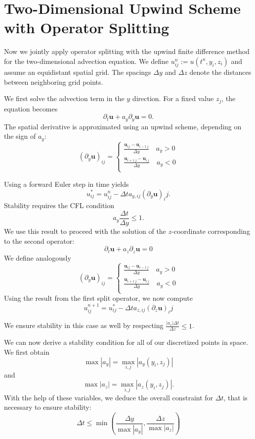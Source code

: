 \section{Two-Dimensional Upwind Scheme with Operator Splitting}\label{2DUpwind}
Now we jointly apply operator splitting with the upwind finite difference
method for the two-dimensional advection equation. We define $u_{ij}^n
:= u(t^n, y_i, z_i)$ and assume an equidistant spatial grid. The spacings
$\Delta y$ and $\Delta z$ denote the distances between neighboring grid
points.

We first solve the advection term in the $y$ direction. For a fixed value
$z_j$, the equation becomes
$$\partial_t \bm{u} + a_y\partial_y \bm{u} = 0.$$
The spatial derivative is approximated using an upwind scheme,
depending on the sign of $a_y$:
\[
(\partial_y\bm{u})_{ij}=
\begin{cases}
    \frac{\bm{u}_{ij}-\bm{u}_{i-1 \,j}}{\Delta y} \quad a_y > 0 \\
     \frac{\bm{u}_{i+1\,j}-\bm{u}_{i\,j}}{\Delta y} \quad a_y < 0 \\
\end{cases}
\]

Using a forward Euler step in time yields
$$u_{ij}^*= u_{ij}^n - \Delta t a_{y,ij}(\partial_y \bm{u})_ij.$$
Stability requires the CFL condition
$$a_y\frac{\Delta t}{\Delta y}\leq 1.$$
We use this result to proceed with the solution of the $z$-coordinate
corresponding to the second operator:
$$\partial_t \bm{u} + a_z\partial_z \bm{u} = 0$$
We define analogously
\[
(\partial_y\bm{u})_{ij}=
\begin{cases}
    \frac{\bm{u}_{ij}-\bm{u}_{i-1 \,j}}{\Delta y} \quad a_y > 0 \\
     \frac{\bm{u}_{i+1\,j}-\bm{u}_{i\,j}}{\Delta y} \quad a_y < 0 \\
\end{cases}
\]
Using the result from the first split operator, we now compute
$$u_{ij}^{n+1}= u_{ij}^* - \Delta t a_{z,ij}(\partial_z \bm{u})_ij$$

We ensure stability in this case as well by respecting $\frac{|a_z|
\Delta t}{\Delta z}\leq 1$.

We can now derive a stability condition for all of our discretized points
in space. We first obtain
$$\max |a_y|= \max_{i,j}|a_y(y_i,z_j)|$$
and 
$$\max |a_z|= \max_{i,j}|a_z(y_i,z_j)|.$$
With the help of these variables, we deduce the overall constraint for
$\Delta t$, that is necessary to ensure stability:
$$ \Delta t \leq \min{\left(\frac{\Delta y}{\max|a_y|}, 
\frac{\Delta z}{\max|a_z|}\right)}$$

